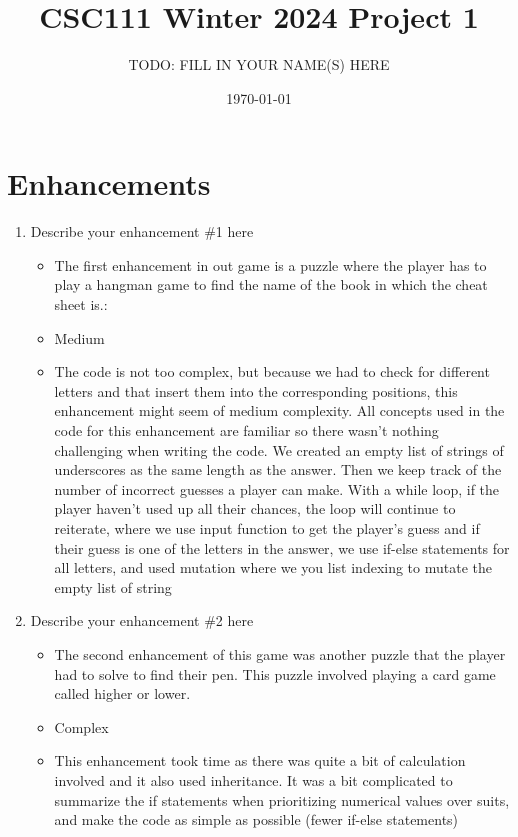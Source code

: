 \documentclass[11pt]{article}
\title{CSC111 Winter 2024 Project 1}
\author{TODO: FILL IN YOUR NAME(S) HERE}
\date{\today}
\begin{document}
\maketitle

\section*{Enhancements}


\begin{enumerate}

\item Describe your enhancement \#1 here
	\begin{itemize}
	\item The first enhancement in out game is a puzzle where the player has to play a hangman game to find the name of the book in which the cheat sheet is.: 
    
	\item Medium
	\item The code is not too complex, but because we had to check for different letters and that insert them into the corresponding positions, this enhancement might seem of medium complexity. All concepts used in the code for this enhancement are familiar so there wasn't nothing challenging when writing the code. We created an empty list of strings of underscores as the same length as the answer. Then we keep track of the number of incorrect guesses a player can make. With a while loop, if the player haven't used up all their chances, the loop will continue to reiterate, where we use input function to get the player's guess and if their guess is one of the letters in the answer, we use if-else statements for all letters, and used mutation where we you list indexing to mutate the empty list of string
	\end{itemize}

\item Describe your enhancement \#2 here
	\begin{itemize}
	\item The second enhancement of this game was another puzzle that the player had to solve to find their pen. This puzzle involved playing a card game called higher or lower.
	\item Complex
	\item This enhancement took time as there was quite a bit of calculation involved and it also used inheritance. It was a bit complicated to summarize the if statements when prioritizing numerical values over suits, and make the code as simple as possible (fewer if-else statements)
        \end{itemize}

\end{enumerate}
\end{document}
